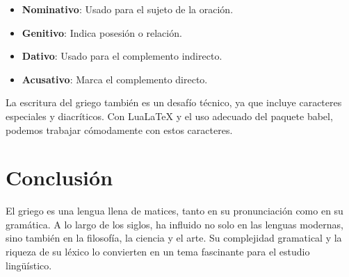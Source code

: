 \begin{itemize}
\item \textbf{Nominativo}: Usado para el sujeto de la oración.
\item \textbf{Genitivo}: Indica posesión o relación.
\item \textbf{Dativo}: Usado para el complemento indirecto.
\item \textbf{Acusativo}: Marca el complemento directo.
\end{itemize}

La escritura del griego también es un desafío técnico, ya que incluye caracteres especiales y diacríticos. Con LuaLaTeX y el uso adecuado del paquete babel, podemos trabajar cómodamente con estos caracteres.

\section{Conclusión}

El griego es una lengua llena de matices, tanto en su pronunciación como en su gramática. A lo largo de los siglos, ha influido no solo en las lenguas modernas, sino también en la filosofía, la ciencia y el arte. Su complejidad gramatical y la riqueza de su léxico lo convierten en un tema fascinante para el estudio lingüístico.

